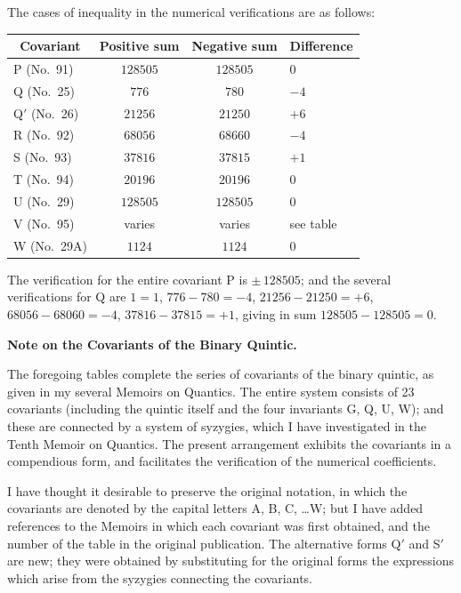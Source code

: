 \documentclass[11pt,a4paper]{article}
\begin{document}
\clearpage
\setcounter{page}{289}

The cases of inequality in the numerical verifications are as follows:

\begin{center}
\begin{tabular}{|l|c|c|l|}
\hline
\multicolumn{1}{|c|}{Covariant} & Positive sum & Negative sum & \multicolumn{1}{c|}{Difference} \\
\hline
P (No.\ 91) & $128505$ & $128505$ & $0$ \\
Q (No.\ 25) & $776$ & $780$ & $-4$ \\
Q$'$ (No.\ 26) & $21256$ & $21250$ & $+6$ \\
R (No.\ 92) & $68056$ & $68660$ & $-4$ \\
S (No.\ 93) & $37816$ & $37815$ & $+1$ \\
T (No.\ 94) & $20196$ & $20196$ & $0$ \\
U (No.\ 29) & $128505$ & $128505$ & $0$ \\
V (No.\ 95) & varies & varies & see table \\
W (No.\ 29A) & $1124$ & $1124$ & $0$ \\
\hline
\end{tabular}
\end{center}

The verification for the entire covariant P is $\pm\,128505$; and the several verifications for Q are $1=1$, $776-780=-4$, $21256-21250=+6$, $68056-68060=-4$, $37816-37815=+1$, giving in sum $128505-128505=0$.

\clearpage
\setcounter{page}{290}

\begin{center}
\textbf{Note on the Covariants of the Binary Quintic.}
\end{center}

The foregoing tables complete the series of covariants of the binary quintic, as given in my several Memoirs on Quantics. The entire system consists of 23 covariants (including the quintic itself and the four invariants G, Q, U, W); and these are connected by a system of syzygies, which I have investigated in the Tenth Memoir on Quantics. The present arrangement exhibits the covariants in a compendious form, and facilitates the verification of the numerical coefficients.

I have thought it desirable to preserve the original notation, in which the covariants are denoted by the capital letters A, B, C, \ldots W; but I have added references to the Memoirs in which each covariant was first obtained, and the number of the table in the original publication. The alternative forms Q$'$ and S$'$ are new; they were obtained by substituting for the original forms the expressions which arise from the syzygies connecting the covariants.
\end{document}
